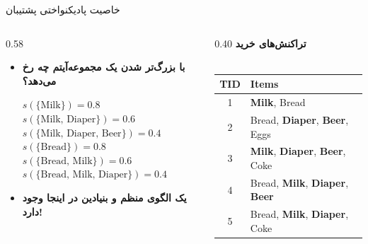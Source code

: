 \begin{frame}{خاصیت پاد‌یکنواختی پشتیبان}{}
\begin{columns}[T,onlytextwidth]
\begin{column}{0.58\textwidth}
\begin{itemize}\setlength{\itemsep}{5pt}
    \item \textbf{با بزرگ‌تر شدن یک مجموعه‌آیتم چه رخ می‌دهد؟}
    \begin{center}
    \begin{latin}
    \small
    $s(\{\text{Milk}\}) = 0.8$ \\
    $s(\{\text{Milk, Diaper}\}) = 0.6$ \\
    $s(\{\text{Milk, Diaper, Beer}\}) = 0.4$ \\[6pt]
    $s(\{\text{Bread}\}) = 0.8$ \\
    $s(\{\text{Bread, Milk}\}) = 0.6$ \\
    $s(\{\text{Bread, Milk, Diaper}\}) = 0.4$
    \end{latin}
    \end{center}
    \item \alert{\textbf{یک الگوی منظم و بنیادین در اینجا وجود دارد!}}
\end{itemize}
\end{column}%
\begin{column}{0.40\textwidth}
\centering
\textbf{\small تراکنش‌های خرید}\\[1pt]
{\scriptsize{}}\\[3pt]
\begin{latin}
\fontsize{7.5}{9.5}\selectfont
\begin{tabular}{|c|l|}
\hline
\rowcolor{mannheimblue!15}
\textbf{TID} & \textbf{Items} \\ \hline
1 & {\color{teal}\textbf{Milk}}, Bread \\ \hline
2 & Bread, {\color{blue}\textbf{Diaper}}, {\color{red}\textbf{Beer}}, Eggs \\ \hline
3 & {\color{teal}\textbf{Milk}}, {\color{blue}\textbf{Diaper}}, {\color{red}\textbf{Beer}}, Coke \\ \hline
4 & Bread, {\color{teal}\textbf{Milk}}, {\color{blue}\textbf{Diaper}}, {\color{red}\textbf{Beer}} \\ \hline
5 & Bread, {\color{teal}\textbf{Milk}}, {\color{blue}\textbf{Diaper}}, Coke \\ \hline
\end{tabular}
\end{latin}
\end{column}
\end{columns}
\end{frame}

